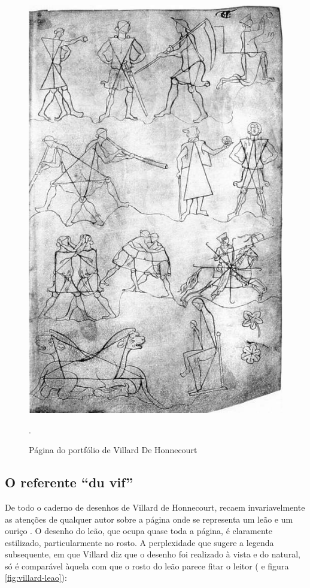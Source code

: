 \documentclass{article}
\begin{document}
\begin{figure}
\centering\includegraphics[height=0.6\textheight,keepaspectratio]
                          {images/villard-figuras-solidas.jpg}
  \caption{Página do portfólio de Villard De Honnecourt}.
  \label{fig:villard-figuras-solidas}
\end{figure}

\subsection{O referente ``du vif''}

De todo o caderno de desenhos de Villard de Honnecourt, recaem
invariavelmente as atenções de qualquer autor sobre a página onde se
representa um leão e um ouriço \cite[p. 20]{villard}. O desenho do
leão, que ocupa quase toda a página, é claramente estilizado,
particularmente no rosto. A perplexidade que sugere a legenda
subsequente, em que Villard diz que o desenho foi realizado à vista e
do natural, só é comparável àquela com que o rosto do leão parece
fitar o leitor (\cite[p. 48]{villard} e figura
\ref{fig:villard-leao}):
\end{document}

